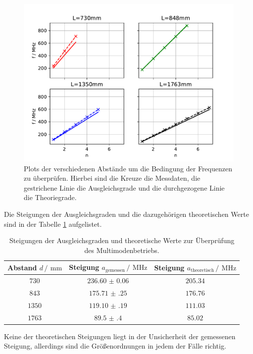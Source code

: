 \begin{figure}
  \centering
  \includegraphics[width = \textwidth, keepaspectratio]{figure/Multimode.pdf}
  \caption{Plots der verschiedenen Abstände um die Bedingung der Frequenzen zu überprüfen. Hierbei sind die Kreuze die Messdaten, die gestrichene Linie die Ausgleichsgrade und die durchgezogene Linie die Theoriegrade.}
\end{figure}
\FloatBarrier
Die Steigungen der Ausgleichsgraden und die dazugehörigen theoretischen Werte sind in der Tabelle \ref{tab:Steigungen} aufgelistet.
\FloatBarrier
\begin{table}
  \centering
  \caption{Steigungen der Ausgleichsgraden und theoretische Werte zur Überprüfung des Multimodenbetriebs.}
  \label{tab:Steigungen}
  \begin{tabular}{c c c}
    \toprule
    Abstand $d\,/\,\SI{}{\milli\meter}$&Steigung $a_{\text{gemessen}}\,/\,\SI{}{\mega\hertz}$&Steigung $a_{\text{theoretisch}}\,/\,\SI{}{\mega\hertz}$\\
    \midrule
    $\num{730}$&$\num{236.60(6)}$&$\num{205.34}$\\
    $\num{843}$&$\num{175.71(25)}$&$\num{176.76}$\\
    $\num{1350}$&$\num{119.10(19)}$&$\num{111.03}$\\
    $\num{1763}$&$\num{89.5(4)}$&$\num{85.02}$\\
    \bottomrule
  \end{tabular}
\end{table}
\FloatBarrier
Keine der theoretischen Steigungen liegt in der Unsicherheit der gemessenen Steigung, allerdings sind die Größenordnungen 
in jedem der Fälle richtig.
